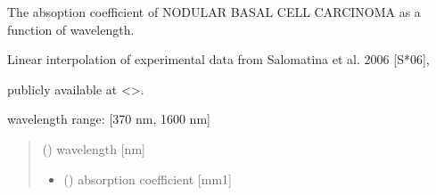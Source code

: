 \documentclass[letterpaper,10pt,english]{sphinxmanual}
\begin{document}
\begin{fulllineitems}
\label{\detokenize{03_absorption_coefficient:skinoptics.absorption_coefficient.mua_nBCC_Salomatina}}
\pysigstartsignatures
{}
\pysigstopsignatures
\begin{DUlineblock}{0em}
\item[] The absoption coefficient of NODULAR BASAL CELL CARCINOMA as a function of wavelength.
\item[] Linear interpolation of experimental data from Salomatina et al. 2006 {[}S*06{]},
\item[] publicly available at \textless{}\textgreater{}.
\end{DUlineblock}

\begin{DUlineblock}{0em}
\item[] wavelength range: {[}370 nm, 1600 nm{]}
\end{DUlineblock}
\begin{quote}\begin{description}
\sphinxAtStartPar
{} () \textendash{} wavelength {[}nm{]}

\sphinxAtStartPar
\begin{itemize}
\item {} 
\sphinxAtStartPar
{} () \textendash{} absorption coefficient {[}mm\sphinxhyphen{}1{]}

\end{itemize}


\end{description}\end{quote}

\end{fulllineitems}

\end{document}
